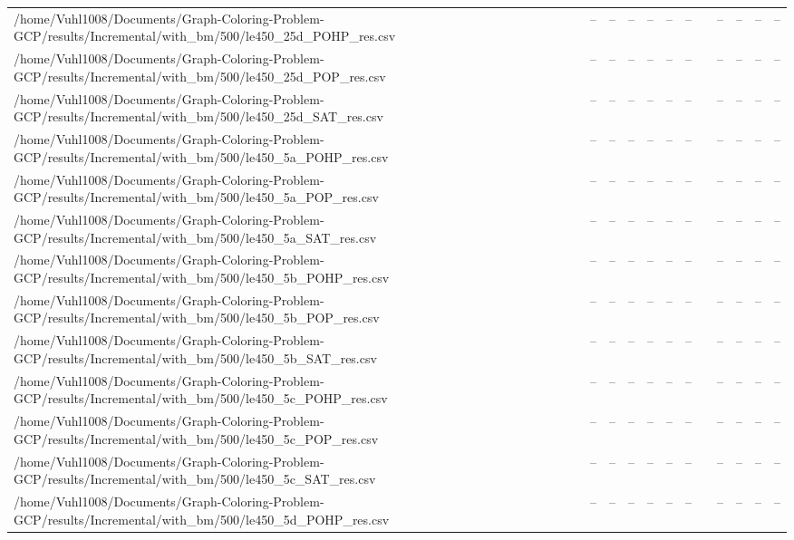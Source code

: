 \begin{table}[htbp]
\begin{tabular}{llllllllllll}
/home/Vuhl1008/Documents/Graph-Coloring-Problem-GCP/results/Incremental/with\_bm/500/le450\_25d\_POHP\_res.csv & -- & -- & -- & -- & -- & -- & {} & -- & -- & -- & -- \\
/home/Vuhl1008/Documents/Graph-Coloring-Problem-GCP/results/Incremental/with\_bm/500/le450\_25d\_POP\_res.csv & -- & -- & -- & -- & -- & -- & {} & -- & -- & -- & -- \\
/home/Vuhl1008/Documents/Graph-Coloring-Problem-GCP/results/Incremental/with\_bm/500/le450\_25d\_SAT\_res.csv & -- & -- & -- & -- & -- & -- & {} & -- & -- & -- & -- \\
/home/Vuhl1008/Documents/Graph-Coloring-Problem-GCP/results/Incremental/with\_bm/500/le450\_5a\_POHP\_res.csv & -- & -- & -- & -- & -- & -- & {} & -- & -- & -- & -- \\
/home/Vuhl1008/Documents/Graph-Coloring-Problem-GCP/results/Incremental/with\_bm/500/le450\_5a\_POP\_res.csv & -- & -- & -- & -- & -- & -- & {} & -- & -- & -- & -- \\
/home/Vuhl1008/Documents/Graph-Coloring-Problem-GCP/results/Incremental/with\_bm/500/le450\_5a\_SAT\_res.csv & -- & -- & -- & -- & -- & -- & {} & -- & -- & -- & -- \\
/home/Vuhl1008/Documents/Graph-Coloring-Problem-GCP/results/Incremental/with\_bm/500/le450\_5b\_POHP\_res.csv & -- & -- & -- & -- & -- & -- & {} & -- & -- & -- & -- \\
/home/Vuhl1008/Documents/Graph-Coloring-Problem-GCP/results/Incremental/with\_bm/500/le450\_5b\_POP\_res.csv & -- & -- & -- & -- & -- & -- & {} & -- & -- & -- & -- \\
/home/Vuhl1008/Documents/Graph-Coloring-Problem-GCP/results/Incremental/with\_bm/500/le450\_5b\_SAT\_res.csv & -- & -- & -- & -- & -- & -- & {} & -- & -- & -- & -- \\
/home/Vuhl1008/Documents/Graph-Coloring-Problem-GCP/results/Incremental/with\_bm/500/le450\_5c\_POHP\_res.csv & -- & -- & -- & -- & -- & -- & {} & -- & -- & -- & -- \\
/home/Vuhl1008/Documents/Graph-Coloring-Problem-GCP/results/Incremental/with\_bm/500/le450\_5c\_POP\_res.csv & -- & -- & -- & -- & -- & -- & {} & -- & -- & -- & -- \\
/home/Vuhl1008/Documents/Graph-Coloring-Problem-GCP/results/Incremental/with\_bm/500/le450\_5c\_SAT\_res.csv & -- & -- & -- & -- & -- & -- & {} & -- & -- & -- & -- \\
/home/Vuhl1008/Documents/Graph-Coloring-Problem-GCP/results/Incremental/with\_bm/500/le450\_5d\_POHP\_res.csv & -- & -- & -- & -- & -- & -- & {} & -- & -- & -- & -- \\

\end{tabular}
\end{table}
